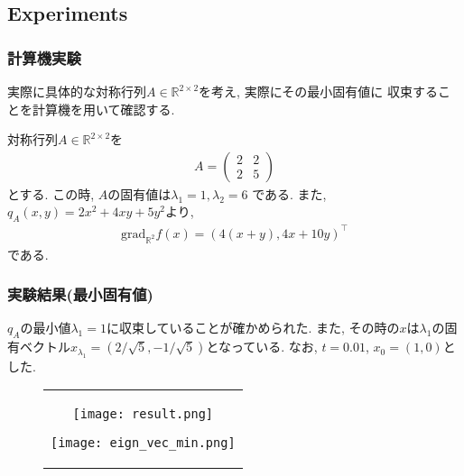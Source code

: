\documentclass[dvipdfmx,11pt]{beamer}		%
\newcommand{\R}{\mathbb{R}}
\begin{document}
    \subsection{Experiments}
    \begin{frame}
        \frametitle{計算機実験}
        実際に具体的な対称行列$A\in\R^{2\times 2}$を考え, 実際にその最小固有値に
        収束することを計算機を用いて確認する\cite{sato}. 
        \begin{exampleblock}{}
            対称行列$A\in\R^{2\times 2}$を
            \begin{align*}
                A = \left(
                    \begin{array}{ccc}
                            2 & 2 \\
                            2 & 5 
                    \end{array}
                    \right)
            \end{align*}
            とする. この時, $A$の固有値は$\lambda_{1} = 1, \lambda_{2} = 6$
            である. また, $q_{A}(x, y) = 2x^2 + 4xy + 5y^2$より, 
            \begin{align*}
                \mathrm{grad}_{\R^2}f(x) = (4(x + y), 4x + 10y)^{\top}
            \end{align*}
            である. 
        \end{exampleblock}
    \end{frame}
    \begin{frame}
        \frametitle{実験結果(最小固有値)}
        $q_{A}$の最小値$\lambda_1 = 1$に収束していることが確かめられた. 
        また, その時の$x$は$\lambda_1$の固有ベクトル$x_{\lambda_1} = (2/\sqrt{5}, -1/\sqrt{5})$となっている. なお, $t = 0.01$, $x_{0} = (1, 0)$とした. 
        \begin{figure}[b]
            \begin{tabular}{c}
                \begin{minipage}{0.55\hsize}
                    \centering
                    \texttt{[image: result.png]}
                \end{minipage}
                \begin{minipage}{0.45\hsize}
                    \centering
                    \texttt{[image: eign\_vec\_min.png]}
                \end{minipage}
            \end{tabular}   
        \end{figure}  
    \end{frame}
\end{document}

